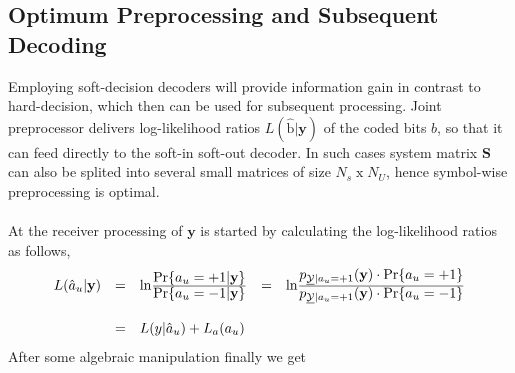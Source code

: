\subsection{Optimum Preprocessing and Subsequent Decoding}
Employing soft-decision decoders will provide information gain in contrast to hard-decision, which then can be used for subsequent processing. Joint preprocessor delivers log-likelihood ratios $L(\mathrm{\hat{b}}\vert \mathrm{\mathbf{y}})$ of the coded bits $b$, so that it can feed directly to the soft-in soft-out decoder. In such cases system matrix $\mathrm{\mathbf{S}}$ can also be splited into several small matrices of size $N_s\;\mathrm{x}\;N_U$, hence symbol-wise preprocessing is optimal. \\ \\
At the receiver processing of $\mathrm{\mathbf{y}}$ is started by calculating the log-likelihood ratios as follows,
\begin{eqnarray}
\begin{array}{lllll}
L(\hat{a}_u\vert \mathrm{\mathbf{y}})&=&\mathrm{ln}\frac{\hbox{$\mathrm{Pr}\{a_u=+1 \vert \mathrm{\mathbf{y}}\}$}}{\hbox{$\mathrm{Pr}\{a_u=-1 \vert \mathrm{\mathbf{y}}\}$}}&=&\mathrm{ln}\frac{\hbox{$p_{\underline{\mathcal{Y}}\vert a_u=+1}(\mathrm{\mathbf{y}})\cdot \mathrm{Pr}\{a_u=+1\}$}}{\hbox{$p_{\underline{\mathcal{Y}}\vert a_u=+1}(\mathrm{\mathbf{y}})\cdot \mathrm{Pr}\{a_u=-1\}$}} \\ \\
&=&L(y\vert \hat{a}_u)+L_a(a_u)
\end{array}
\end{eqnarray}
After some algebraic manipulation finally we get

